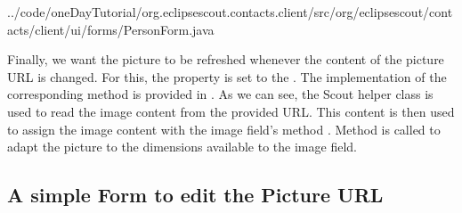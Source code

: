 \documentclass[a4paper,10pt,twoside]{book}
\begin{document}

{../code/oneDayTutorial/org.eclipsescout.contacts.client/src/org/eclipsescout/contacts/client/ui/forms/PersonForm.java}

Finally, we want the picture to be refreshed whenever the content of the picture URL is changed. 
For this, the property  is set to the . 
The implementation of the corresponding method  is provided in . 
As we can see, the Scout helper class  is used to read the image content from the provided URL. 
This content is then used to assign the image content with the image field's method . 
Method  is called to adapt the picture to the dimensions available to the image field. 

\subsection{A simple Form to edit the Picture URL}
\end{document}
